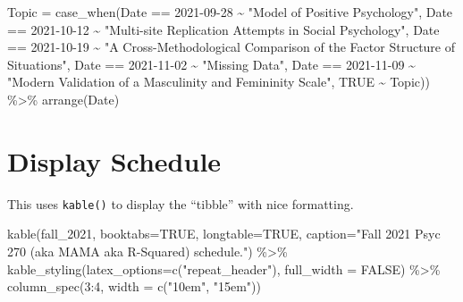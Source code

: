\documentclass[]{tufte-handout}
\newenvironment{Shaded}{}{}
\newcommand{\AttributeTok}[1]{\textcolor[rgb]{0.49,0.56,0.16}{#1}}
\newcommand{\ConstantTok}[1]{\textcolor[rgb]{0.53,0.00,0.00}{#1}}
\newcommand{\DecValTok}[1]{\textcolor[rgb]{0.25,0.63,0.44}{#1}}
\newcommand{\FunctionTok}[1]{\textcolor[rgb]{0.02,0.16,0.49}{#1}}
\newcommand{\NormalTok}[1]{#1}
\newcommand{\SpecialCharTok}[1]{\textcolor[rgb]{0.25,0.44,0.63}{#1}}
\newcommand{\StringTok}[1]{\textcolor[rgb]{0.25,0.44,0.63}{#1}}
\begin{document}
\begin{Shaded}
\begin{Highlighting}[]
         \AttributeTok{Topic =} \FunctionTok{case\_when}\NormalTok{(Date }\SpecialCharTok{==} \StringTok{\textquotesingle{}2021{-}09{-}28\textquotesingle{}} \SpecialCharTok{\textasciitilde{}} \StringTok{"Model of Positive Psychology"}\NormalTok{,}
\NormalTok{                           Date }\SpecialCharTok{==} \StringTok{\textquotesingle{}2021{-}10{-}12\textquotesingle{}} \SpecialCharTok{\textasciitilde{}}
                             \StringTok{"Multi{-}site Replication Attempts in Social Psychology"}\NormalTok{,}
\NormalTok{                           Date }\SpecialCharTok{==} \StringTok{\textquotesingle{}2021{-}10{-}19\textquotesingle{}} \SpecialCharTok{\textasciitilde{}}
                             \StringTok{"A Cross{-}Methodological Comparison of the Factor Structure of Situations"}\NormalTok{,}
\NormalTok{                           Date }\SpecialCharTok{==} \StringTok{\textquotesingle{}2021{-}11{-}02\textquotesingle{}} \SpecialCharTok{\textasciitilde{}} \StringTok{"Missing Data"}\NormalTok{,}
\NormalTok{                           Date }\SpecialCharTok{==} \StringTok{\textquotesingle{}2021{-}11{-}09\textquotesingle{}} \SpecialCharTok{\textasciitilde{}}
                             \StringTok{"Modern Validation of a Masculinity and Femininity Scale"}\NormalTok{,}
                           \ConstantTok{TRUE} \SpecialCharTok{\textasciitilde{}}\NormalTok{ Topic)) }\SpecialCharTok{\%\textgreater{}\%}
  \FunctionTok{arrange}\NormalTok{(Date)}
\end{Highlighting}
\end{Shaded}

\hypertarget{display-schedule}{%
\section{Display Schedule}\label{display-schedule}}

This uses \texttt{kable()} to display the ``tibble'' with nice
formatting.

\begin{Shaded}
\begin{Highlighting}[]
\FunctionTok{kable}\NormalTok{(fall\_2021, }\AttributeTok{booktabs=}\ConstantTok{TRUE}\NormalTok{, }\AttributeTok{longtable=}\ConstantTok{TRUE}\NormalTok{, }
      \AttributeTok{caption=}\StringTok{"Fall 2021 Psyc 270 (aka MAMA aka R{-}Squared) schedule."}\NormalTok{) }\SpecialCharTok{\%\textgreater{}\%}
  \FunctionTok{kable\_styling}\NormalTok{(}\AttributeTok{latex\_options=}\FunctionTok{c}\NormalTok{(}\StringTok{"repeat\_header"}\NormalTok{), }\AttributeTok{full\_width =} \ConstantTok{FALSE}\NormalTok{) }\SpecialCharTok{\%\textgreater{}\%}
  \FunctionTok{column\_spec}\NormalTok{(}\DecValTok{3}\SpecialCharTok{:}\DecValTok{4}\NormalTok{, }\AttributeTok{width =} \FunctionTok{c}\NormalTok{(}\StringTok{"10em"}\NormalTok{, }\StringTok{"15em"}\NormalTok{))}
\end{Highlighting}
\end{Shaded}
\end{document}

